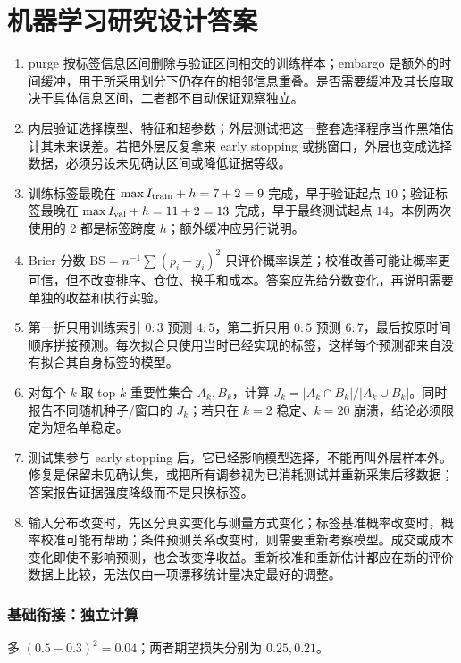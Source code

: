 \chapter{机器学习研究设计答案}

\begin{enumerate}[leftmargin=*]
  \item purge 按标签信息区间删除与验证区间相交的训练样本；embargo 是额外的时间缓冲，用于所采用划分下仍存在的相邻信息重叠。是否需要缓冲及其长度取决于具体信息区间，二者都不自动保证观察独立。
  \item 内层验证选择模型、特征和超参数；外层测试把这一整套选择程序当作黑箱估计其未来误差。若把外层反复拿来 early stopping 或挑窗口，外层也变成选择数据，必须另设未见确认区间或降低证据等级。
  \item 训练标签最晚在 $\max I_{\rm train}+h=7+2=9$ 完成，早于验证起点 $10$；验证标签最晚在 $\max I_{\rm val}+h=11+2=13$ 完成，早于最终测试起点 $14$。本例两次使用的 2 都是标签跨度 $h$；额外缓冲应另行说明。
  \item Brier 分数 $\mathrm{BS}=n^{-1}\sum(p_i-y_i)^2$ 只评价概率误差；校准改善可能让概率更可信，但不改变排序、仓位、换手和成本。答案应先给分数变化，再说明需要单独的收益和执行实验。
  \item 第一折只用训练索引 $0\!:\!3$ 预测 $4\!:\!5$，第二折只用 $0\!:\!5$ 预测 $6\!:\!7$，最后按原时间顺序拼接预测。每次拟合只使用当时已经实现的标签，这样每个预测都来自没有拟合其自身标签的模型。
  \item 对每个 $k$ 取 top-$k$ 重要性集合 $A_k,B_k$，计算 $J_k=|A_k\cap B_k|/|A_k\cup B_k|$。同时报告不同随机种子/窗口的 $J_k$；若只在 $k=2$ 稳定、$k=20$ 崩溃，结论必须限定为短名单稳定。
  \item 测试集参与 early stopping 后，它已经影响模型选择，不能再叫外层样本外。修复是保留未见确认集，或把所有调参视为已消耗测试并重新采集后移数据；答案报告证据强度降级而不是只换标签。
  \item 输入分布改变时，先区分真实变化与测量方式变化；标签基准概率改变时，概率校准可能有帮助；条件预测关系改变时，则需要重新考察模型。成交或成本变化即使不影响预测，也会改变净收益。重新校准和重新估计都应在新的评价数据上比较，无法仅由一项漂移统计量决定最好的调整。
\end{enumerate}

\subsection*{基础衔接：独立计算}
多 $(0.5-0.3)^2=0.04$；两者期望损失分别为 $0.25,0.21$。
